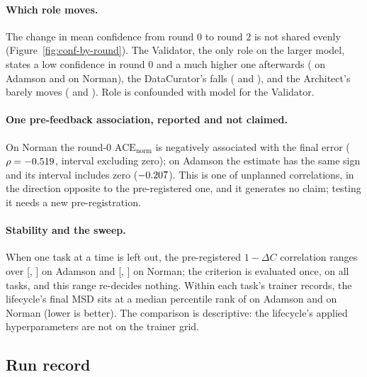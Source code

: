 \paragraph{Which role moves.} The change in mean confidence from round $0$ to round $2$ is not
shared evenly (Figure~\ref{fig:conf-by-round}). The Validator, the only role on the larger
model, states a low confidence in round $0$ and a much higher one afterwards
(\explAdaRoleValidatorConfChange{} on Adamson and \explNorRoleValidatorConfChange{} on Norman), the
DataCurator's falls (\explAdaRoleCuratorConfChange{} and \explNorRoleCuratorConfChange), and the
Architect's barely moves (\explAdaRoleArchitectConfChange{} and \explNorRoleArchitectConfChange).
Role is confounded with model for the Validator.

\paragraph{One pre-feedback association, reported and not claimed.} On Norman the round-$0$
$\mathrm{ACE}_{\mathrm{norm}}$ is negatively associated with the final error
($\rho=-0.519$, interval excluding zero); on Adamson the estimate has the same sign
and its interval includes zero ($-0.207$). This is one of \explNCorrelations{}
unplanned correlations, in the direction opposite to the pre-registered one, and it generates no
claim; testing it needs a new pre-registration.

\paragraph{Stability and the sweep.} When one task at a time is left out, the pre-registered
$1-\Delta C$ correlation ranges over [\explAdaLotoDcRhoMin, \explAdaLotoDcRhoMax] on Adamson and
[\explNorLotoDcRhoMin, \explNorLotoDcRhoMax] on Norman; the criterion is evaluated once, on all
tasks, and this range re-decides nothing. Within each task's \resNTrainerRecordsPerTask{} trainer
records, the lifecycle's final MSD sits at a median percentile rank of \explAdaOraclePctRankMedian{}
on Adamson and \explNorOraclePctRankMedian{} on Norman (lower is better). The comparison is
descriptive: the lifecycle's applied hyperparameters are not on the trainer grid.

\subsection{Run record}\label{subsec:runrecord}

